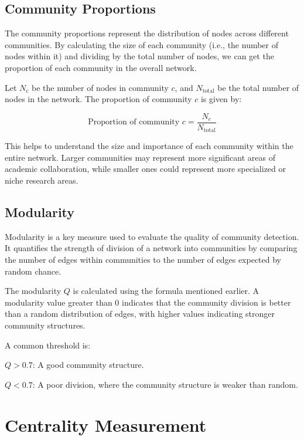 \documentclass[11pt]{article}
\begin{document}
\subsection{Community Proportions}
The community proportions represent the distribution of nodes across different communities. By calculating the size of each community (i.e., the number of nodes within it) and dividing by the total number of nodes, we can get the proportion of each community in the overall network.

Let \( N_c \) be the number of nodes in community \( c \), and $ N_{\text{total}} $ be the total number of nodes in the network. The proportion of community \( c \) is given by:

\begin{equation}
	\text{Proportion of community } c = \frac{N_c}{N_{\text{total}}}
	\nonumber
\end{equation}

This helps to understand the size and importance of each community within the entire network. Larger communities may represent more significant areas of academic collaboration, while smaller ones could represent more specialized or niche research areas.

\subsection{Modularity}

Modularity is a key measure used to evaluate the quality of community detection. It quantifies the strength of division of a network into communities by comparing the number of edges within communities to the number of edges expected by random chance.

The modularity \( Q \) is calculated using the formula mentioned earlier. A modularity value greater than 0 indicates that the community division is better than a random distribution of edges, with higher values indicating stronger community structures.

A common threshold is:

\( Q > 0.7 \): A good community structure.

\( Q < 0.7 \): A poor division, where the community structure is weaker than random.



\section{Centrality Measurement}
\end{document}
